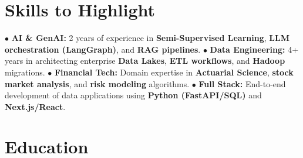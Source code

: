 \documentclass[letterpaper]{twentysecondcv} %
\begin{document}
\makeprofile %

\section{Skills to Highlight}

$\bullet$ \textbf{AI \& GenAI:} 2 years of experience in \textbf{Semi-Supervised Learning}, \textbf{LLM orchestration (LangGraph)}, and \textbf{RAG pipelines}. \newline
$\bullet$ \textbf{Data Engineering:} 4+ years in architecting enterprise \textbf{Data Lakes}, \textbf{ETL workflows}, and \textbf{Hadoop} migrations. \newline
$\bullet$ \textbf{Financial Tech:} Domain expertise in \textbf{Actuarial Science}, \textbf{stock market analysis}, and \textbf{risk modeling} algorithms. \newline
$\bullet$ \textbf{Full Stack:} End-to-end development of data applications using \textbf{Python (FastAPI/SQL)} and \textbf{Next.js/React}. \newline



\section{Education}

\begin{twenty} 
\end{twenty}

\end{document}
